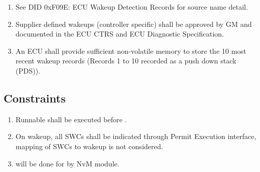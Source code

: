 \begin{enumerate}
\item See DID 0xF09E: ECU Wakeup Detection Records for source name detail.
\item Supplier defined wakeups (controller specific) shall be approved by GM and documented in the ECU CTRS and ECU Diagnostic Specification.
\item An ECU shall provide sufficient non-volatile memory to store the 10 most recent wakeup records (Records 1 to 10 recorded as a push down stack (PDS)).
\end{enumerate}

\subsection{Constraints}
\label{sec:constraints}

\begin{enumerate}
\item Runnable  shall be executed before .
\item On wakeup, all SWCs shall be indicated through Permit Execution interface, mapping of SWCs to wakeup is not considered.
\item {} will be done for  by NvM module.
\end{enumerate}
